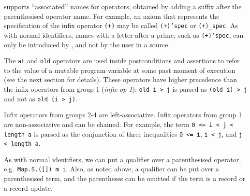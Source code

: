 \whyml supports ``associated'' names for operators, obtained
by adding a suffix after the parenthesised operator name.
For example, an axiom that represents the specification of the
infix operator \texttt{(+)} may be called \texttt{(+)'spec}
or \texttt{(+)\_spec}. As with normal identifiers, names
with a letter after a prime, such as \texttt{(+)'spec},
can only be introduced by \why, and not by the user in a \whyml
source.

The \texttt{at} and \texttt{old} operators are used inside
postconditions and assertions to refer to the value of
a mutable program variable at some past moment of execution
(see the next section for details).
These operators have higher precedence than the infix
operators from group 1 (\textsl{infix-op-1}): \texttt{old i > j}
is parsed as \texttt{(old i) > j} and not as \texttt{old (i > j)}.

Infix operators from groups 2-4 are left-associative.
Infix operators from group 1 are non-associative and
can be chained. For example, the term \texttt{0 <= i < j < length a}
is parsed as the conjunction of three inequalities \texttt{0 <= i},
\texttt{i < j}, and \texttt{j < length a}.

As with normal identifiers,
we can put a qualifier over a parenthesised operator,
e.g.~\texttt{Map.S.([]) m i}. Also, as noted above,
a qualifier can be put over a parenthesised term,
and the parentheses
can be omitted if the term is a record or a record update.

